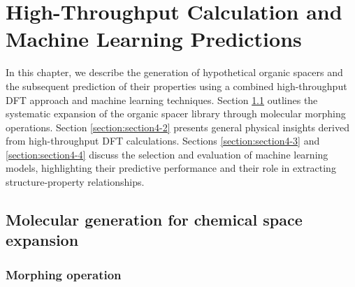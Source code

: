 \chapter[High-Throughput Calculation and Machine Learning Predictions]{High-Throughput Calculation and Machine Learning Predictions} \label{c:result-1} 

In this chapter, we describe the generation of hypothetical organic spacers and the subsequent prediction of their properties using a combined high-throughput DFT approach and machine learning techniques. Section \ref{section:section4-1} outlines the systematic expansion of the organic spacer library through molecular morphing operations. Section \ref{section:section4-2} presents general physical insights derived from high-throughput DFT calculations. Sections \ref{section:section4-3} and \ref{section:section4-4} discuss the selection and evaluation of machine learning models, highlighting their predictive performance and their role in extracting structure-property relationships.


\section{Molecular generation for chemical space expansion}\label{section:section4-1}

\subsection{Morphing operation}

